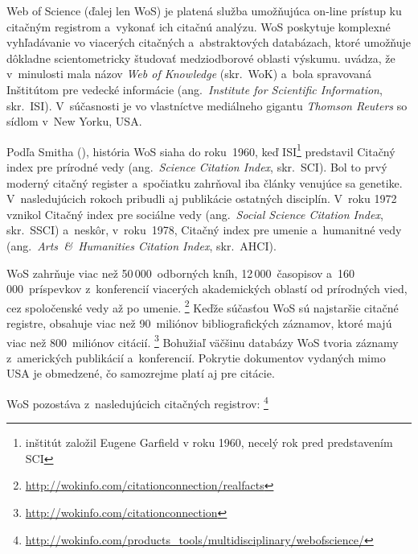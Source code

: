 Web of Science (ďalej len WoS) je platená služba umožňujúca on-line prístup ku
citačným registrom a~vykonať ich citačnú analýzu.  WoS poskytuje komplexné
vyhľadávanie vo viacerých citačných a~abstraktových databázach, ktoré umožňuje
dôkladne scientometricky študovať medziodborové oblasti výskumu.
\citet{Drake2005} uvádza, že v~minulosti mala názov \emph{Web of Knowledge}
(skr.~WoK) a~bola spravovaná Inštitútom pre vedecké informácie
(ang.~\emph{Institute for Scientific Information}, skr.~ISI).  V~súčasnosti je
vo vlastníctve mediálneho gigantu \emph{Thomson Reuters} so sídlom v~New Yorku,
USA.

Podľa Smitha (\citeyear{Smith2012}), história WoS siaha do roku~1960, keď
ISI\footnote{inštitút založil Eugene Garfield v roku 1960, necelý rok pred
  predstavením SCI} predstavil Citačný index pre prírodné vedy
(ang.~\emph{Science Citation Index}, skr.~SCI).  Bol to prvý moderný citačný
register a~spočiatku zahrňoval iba články venujúce sa genetike.  V~nasledujúcich
rokoch pribudli aj publikácie ostatných disciplín.  V~roku 1972 vznikol Citačný
index pre sociálne vedy (ang.~\emph{Social Science Citation Index}, skr.~SSCI)
a~neskôr, v~roku~1978, Citačný index pre umenie a~humanitné vedy
(ang.~\emph{Arts~\&~Humanities Citation Index}, skr.~AHCI).

WoS zahrňuje viac než 50\,000~odborných kníh, 12\,000~časopisov
a~160\,000~príspevkov z~konferencií viacerých akademických oblastí od prírodných
vied, cez spoločenské vedy až po umenie.%
\footnote{\url{http://wokinfo.com/citationconnection/realfacts}} Keďže súčasťou
WoS sú najstaršie citačné registre, obsahuje viac než 90~miliónov
bibliografických záznamov, ktoré majú viac než 800~miliónov citácií.%
\footnote{\url{http://wokinfo.com/citationconnection}} Bohužiaľ väčšinu databázy
WoS tvoria záznamy z~amerických publikácií a~konferencií.  Pokrytie dokumentov
vydaných mimo USA je obmedzené, čo samozrejme platí aj pre citácie.

WoS pozostáva z~nasledujúcich citačných registrov:%
\footnote{\url{http://wokinfo.com/products_tools/multidisciplinary/webofscience/}}

